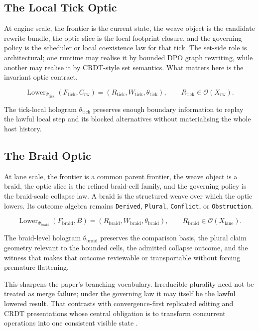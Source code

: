 \documentclass{aion}
\begin{document}
\subsection{The Local Tick Optic}

At engine scale, the frontier is the current state, the weave
object is the candidate rewrite bundle, the optic slice is the local footprint
closure, and the governing policy is the scheduler or local coexistence law for
that tick. The set-side role is architectural; one runtime may realise it by
bounded DPO graph rewriting, while another may realise it by CRDT-style set
semantics. What matters here is the invariant optic contract.

\[
	\operatorname{Lower}_{\Psi_{\mathrm{tick}}}(F_{\mathrm{tick}}, C_{\mathrm{rw}})
	=
	(R_{\mathrm{tick}}, W_{\mathrm{tick}}, \theta_{\mathrm{tick}}),
	\qquad
	R_{\mathrm{tick}} \in \mathcal{O}(X_{\mathrm{rw}}).
\]

The tick-local hologram \(\theta_{\mathrm{tick}}\) preserves enough boundary
information to replay the lawful local step and its blocked alternatives
without materialising the whole host history.

\subsection{The Braid Optic}

At lane scale, the frontier is a common parent frontier, the weave
object is a braid, the optic slice is the refined braid-cell family, and the
governing policy is the braid-scale collapse law. A braid is the structured
weave over which the optic lowers.
Its outcome algebra remains \texttt{Derived}, \texttt{Plural},
\texttt{Conflict}, or \texttt{Obstruction}.

\[
	\operatorname{Lower}_{\Psi_{\mathrm{braid}}}(F_{\mathrm{braid}}, B)
	=
	(R_{\mathrm{braid}}, W_{\mathrm{braid}}, \theta_{\mathrm{braid}}),
	\qquad
	R_{\mathrm{braid}} \in \mathcal{O}(X_{\mathrm{lane}}).
\]

The braid-level hologram \(\theta_{\mathrm{braid}}\) preserves the comparison
basis, the plural claim geometry relevant to the bounded cells, the admitted
collapse outcome, and the witness that makes that outcome reviewable or
transportable without forcing premature flattening.

This sharpens the paper's branching vocabulary. Irreducible plurality need not
be treated as merge failure; under the governing law it may itself be the
lawful lowered result. That contrasts with convergence-first replicated
editing and CRDT presentations whose central obligation is to transform
concurrent operations into one consistent visible state
\cite{Ellis1989,Shapiro2011}.
\end{document}
